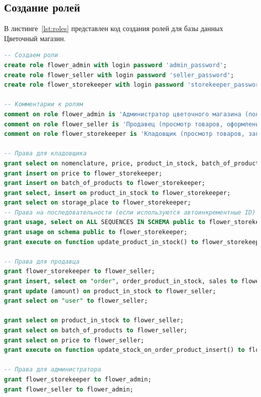 \subsection{Создание ролей}
В листинге~\ref{lst:roles} представлен код создания ролей для базы данных Цветочный магазин.
\begin{lstlisting}[label=lst:roles, caption=Создание ролей для базы данных, language=SQL]
-- Создаем роли
create role flower_admin with login password 'admin_password';
create role flower_seller with login password 'seller_password';
create role flower_storekeeper with login password 'storekeeper_password';

-- Комментарии к ролям
comment on role flower_admin is 'Администратор цветочного магазина (полные права)';
comment on role flower_seller is 'Продавец (просмотр товаров, оформление заказов)';
comment on role flower_storekeeper is 'Кладовщик (просмотр товаров, загрузка партий)';

-- Права для кладовщика
grant select on nomenclature, price, product_in_stock, batch_of_products, country to flower_storekeeper;
grant insert on price to flower_storekeeper;
grant insert on batch_of_products to flower_storekeeper;
grant select, insert on product_in_stock to flower_storekeeper;
grant select on storage_place to flower_storekeeper;
-- Права на последовательности (если используются автоинкрементные ID)
grant usage, select on ALL SEQUENCES IN SCHEMA public to flower_storekeeper;
grant usage on schema public to flower_storekeeper;
grant execute on function update_product_in_stock() to flower_storekeeper;

-- Права для продавца
grant flower_storekeeper to flower_seller;
grant insert, select on "order", order_product_in_stock, sales to flower_seller;
grant update (amount) on product_in_stock to flower_seller;
grant select on "user" to flower_seller;

grant select on product_in_stock to flower_seller;
grant select on batch_of_products to flower_seller;
grant select on price to flower_seller;
grant execute on function update_stock_on_order_product_insert() to flower_seller;

-- Права для администратора
grant flower_storekeeper to flower_admin;
grant flower_seller to flower_admin;

\end{lstlisting}
